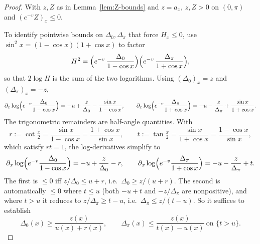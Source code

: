 \documentclass[10pt,a4paper]{amsart}
\begin{document}
\begin{proof}
With $z, Z$ as in Lemma~\ref{lem:Z-bounds} and $z=a_x$,
$z,Z>0$ on $(0,\pi)$ and $(e^{-v}Z)_x\leq 0$.

To identify pointwise bounds on $\Delta_0,\Delta_\pi$ that force $H_x\leq 0$, use
$\sin^2 x=(1-\cos x)(1+\cos x)$ to factor
\[
H^2=\Bigl(e^{-v}\,\frac{\Delta_0}{1-\cos x}\Bigr)\Bigl(e^{-v}\,\frac{\Delta_\pi}{1+\cos x}\Bigr),
\]
so that $2\log H$ is the sum of the two logarithms. Using $(\Delta_0)_x=z$
and $(\Delta_\pi)_x=-z$,
\[
\partial_x\log\Bigl(e^{-v}\frac{\Delta_0}{1-\cos x}\Bigr)=-u+\frac z{\Delta_0}-\frac{\sin x}{1-\cos x},\qquad
\partial_x\log\Bigl(e^{-v}\frac{\Delta_\pi}{1+\cos x}\Bigr)=-u-\frac z{\Delta_\pi}+\frac{\sin x}{1+\cos x}.
\]
The trigonometric remainders are half-angle quantities. With
\begin{equation}\label{eq:rt-def}
r:=\cot\tfrac x2=\frac{\sin x}{1-\cos x}=\frac{1+\cos x}{\sin x},\qquad
t:=\tan\tfrac x2=\frac{\sin x}{1+\cos x}=\frac{1-\cos x}{\sin x},
\end{equation}
which satisfy $rt=1$, the log-derivatives simplify to
\[
\partial_x\log\Bigl(e^{-v}\frac{\Delta_0}{1-\cos x}\Bigr)=-u+\frac{z}{\Delta_0}-r,\qquad
\partial_x\log\Bigl(e^{-v}\frac{\Delta_\pi}{1+\cos x}\Bigr)=-u-\frac{z}{\Delta_\pi}+t.
\]
The first is $\leq 0$ iff $z/\Delta_0\leq u+r$, i.e.\ $\Delta_0\geq z/(u+r)$.
The second is automatically $\leq 0$ where $t\leq u$ (both $-u+t$ and
$-z/\Delta_\pi$ are nonpositive), and where $t>u$ it reduces to
$z/\Delta_\pi\geq t-u$, i.e.\ $\Delta_\pi\leq z/(t-u)$. So it suffices to establish
\begin{equation}\label{eq:a-pm-bounds}
\Delta_0(x)\geq\frac{z(x)}{u(x)+r(x)},\qquad
\Delta_\pi(x)\leq\frac{z(x)}{t(x)-u(x)}\ \text{on $\{t>u\}$.}
\end{equation}


\end{proof}
\end{document}
